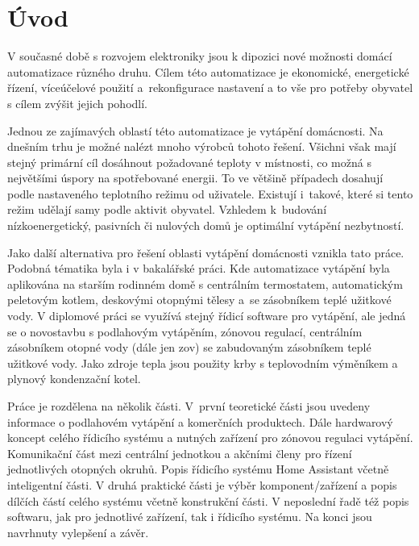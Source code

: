 \chapter{Úvod}

V současné době s rozvojem elektroniky jsou k dipozici nové možnosti domácí automatizace různého druhu. Cílem této automatizace je ekonomické, energetické řízení, víceúčelové použití a~rekonfigurace nastavení a to vše pro potřeby obyvatel s cílem zvýšit jejich pohodlí.


Jednou ze zajímavých oblastí této automatizace je vytápění domácnosti. Na dnešním trhu je možné nalézt mnoho výrobců tohoto řešení. Všichni však mají stejný primární cíl dosáhnout požadované teploty v místnosti, co možná s největšími úspory na spotřebované energii. To ve většině případech dosahují podle nastaveného teplotního režimu od uživatele. Existují i~takové, které si tento režim udělají samy podle aktivit obyvatel. Vzhledem k~budování nízkoenergetický, pasivních či nulových domů je optimální vytápění nezbytností.

Jako další alternativa pro řešení oblasti vytápění domácnosti vznikla tato práce. Podobná tématika byla i v bakalářské práci. Kde automatizace vytápění byla aplikována na starším rodinném domě s centrálním termostatem, automatickým peletovým kotlem, deskovými otopnými tělesy a~se zásobníkem teplé užitkové vody. V diplomové práci se využívá stejný řídicí software pro vytápění, ale jedná se o novostavbu s podlahovým vytápěním, zónovou regulací, centrálním zásobníkem otopné vody (dále jen \acrshort{zov}) se zabudovaným zásobníkem teplé užitkové vody. Jako zdroje tepla jsou použity krby s teplovodním výměníkem a plynový kondenzační kotel.

Práce je rozdělena na několik části. V~první teoretické části jsou uvedeny informace o podlahovém vytápění a komerčních produktech. Dále hardwarový koncept celého řídicího systému a nutných zařízení pro zónovou regulaci vytápění. Komunikační část mezi centrální jednotkou a akčními členy pro řízení jednotlivých otopných okruhů. Popis řídicího systému Home Assistant včetně inteligentní části. V druhá praktické části je výběr komponent/zařízení a popis dílčích částí celého systému včetně konstrukční části. V neposlední řadě též popis softwaru, jak pro jednotlivé zařízení, tak i řídicího systému. Na konci jsou navrhnuty vylepšení a závěr.

\newpage
